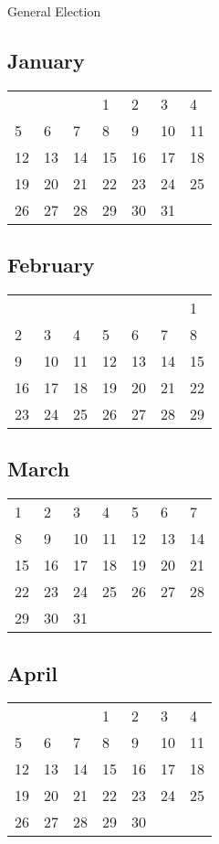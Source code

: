 General Election

\hypertarget{january}{%
\subsection{January}\label{january}}

\begin{longtable}[]{@{}lllllll@{}}
\toprule
\endhead
& & & 1 & 2 & 3 & 4\tabularnewline
5 & 6 & 7 & 8 & 9 & 10 & 11\tabularnewline
12 & 13 & 14 & 15 & 16 & 17 & 18\tabularnewline
19 & 20 & 21 & 22 & 23 & 24 & 25\tabularnewline
26 & 27 & 28 & 29 & 30 & 31 &\tabularnewline
\bottomrule
\end{longtable}

\hypertarget{february}{%
\subsection{February}\label{february}}

\begin{longtable}[]{@{}lllllll@{}}
\toprule
\endhead
& & & & & & 1\tabularnewline
2 & 3 & 4 & 5 & 6 & 7 & 8\tabularnewline
9 & 10 & 11 & 12 & 13 & 14 & 15\tabularnewline
16 & 17 & 18 & 19 & 20 & 21 & 22\tabularnewline
23 & 24 & 25 & 26 & 27 & 28 & 29\tabularnewline
\bottomrule
\end{longtable}

\hypertarget{march}{%
\subsection{March}\label{march}}

\begin{longtable}[]{@{}lllllll@{}}
\toprule
\endhead
1 & 2 & 3 & 4 & 5 & 6 & 7\tabularnewline
8 & 9 & 10 & 11 & 12 & 13 & 14\tabularnewline
15 & 16 & 17 & 18 & 19 & 20 & 21\tabularnewline
22 & 23 & 24 & 25 & 26 & 27 & 28\tabularnewline
29 & 30 & 31 & & & &\tabularnewline
\bottomrule
\end{longtable}

\hypertarget{april}{%
\subsection{April}\label{april}}

\begin{longtable}[]{@{}lllllll@{}}
\toprule
\endhead
& & & 1 & 2 & 3 & 4\tabularnewline
5 & 6 & 7 & 8 & 9 & 10 & 11\tabularnewline
12 & 13 & 14 & 15 & 16 & 17 & 18\tabularnewline
19 & 20 & 21 & 22 & 23 & 24 & 25\tabularnewline
26 & 27 & 28 & 29 & 30 & &\tabularnewline
\bottomrule
\end{longtable}

